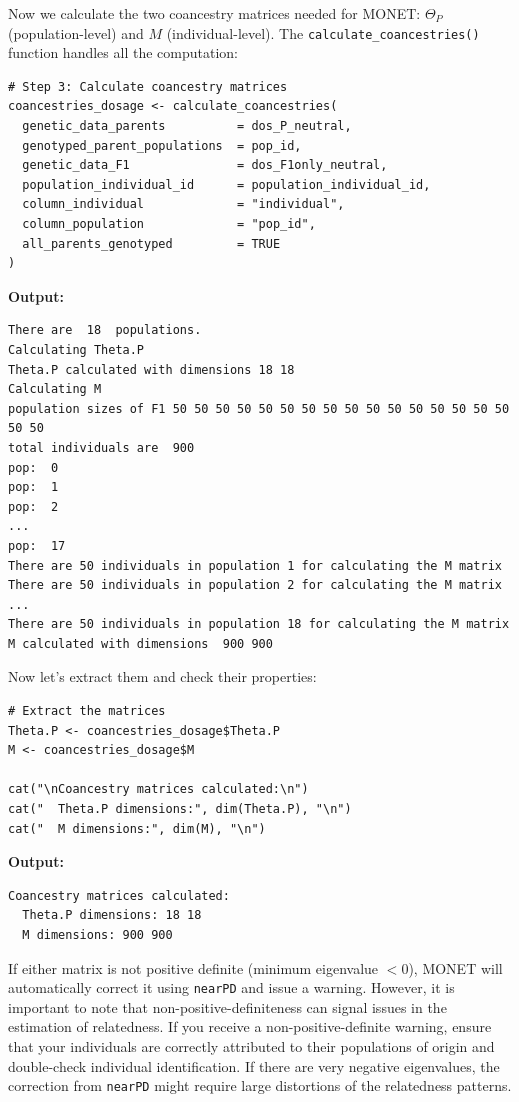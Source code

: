 \documentclass[11pt]{article}
\begin{document}
Now we calculate the two coancestry matrices needed for MONET: $\Theta_P$ (population-level) and $M$ (individual-level). The \texttt{calculate\_coancestries()} function handles all the computation:

\begin{lstlisting}
# Step 3: Calculate coancestry matrices
coancestries_dosage <- calculate_coancestries(
  genetic_data_parents          = dos_P_neutral,
  genotyped_parent_populations  = pop_id,
  genetic_data_F1               = dos_F1only_neutral,
  population_individual_id      = population_individual_id,
  column_individual             = "individual",
  column_population             = "pop_id",
  all_parents_genotyped         = TRUE
)
\end{lstlisting}

\textbf{Output:}
\begin{verbatim}
There are  18  populations. 
Calculating Theta.P 
Theta.P calculated with dimensions 18 18 
Calculating M 
population sizes of F1 50 50 50 50 50 50 50 50 50 50 50 50 50 50 50 50 50 50 
total individuals are  900 
pop:  0 
pop:  1 
pop:  2 
...
pop:  17 
There are 50 individuals in population 1 for calculating the M matrix
There are 50 individuals in population 2 for calculating the M matrix
...
There are 50 individuals in population 18 for calculating the M matrix
M calculated with dimensions  900 900
\end{verbatim}

Now let's extract them and check their properties:

\begin{lstlisting}
# Extract the matrices
Theta.P <- coancestries_dosage$Theta.P
M <- coancestries_dosage$M

cat("\nCoancestry matrices calculated:\n")
cat("  Theta.P dimensions:", dim(Theta.P), "\n")
cat("  M dimensions:", dim(M), "\n")
\end{lstlisting}

\textbf{Output:}
\begin{verbatim}
Coancestry matrices calculated:
  Theta.P dimensions: 18 18 
  M dimensions: 900 900
\end{verbatim}

If either matrix is not positive definite (minimum eigenvalue $< 0$), MONET will automatically correct it using \texttt{nearPD} and issue a warning. However, it is important to note that non-positive-definiteness can signal issues in the estimation of relatedness. If you receive a non-positive-definite warning, ensure that your individuals are correctly attributed to their populations of origin and double-check individual identification. If there are very negative eigenvalues, the correction from \texttt{nearPD} might require large distortions of the relatedness patterns. 
\end{document}
